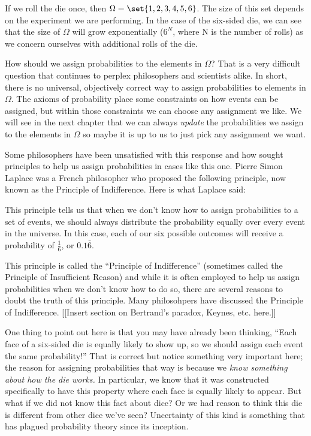 If we roll the die once, then $\Omega=\set{1,2,3,4,5,6}$. The size of this set depends on the experiment we are performing. In the case of the six-sided die, we can see that the size of $\Omega$ will grow exponentially ($6^N$, where N is the number of rolls) as we concern ourselves with additional rolls of the die.

How should we assign probabilities to the elements in $\Omega$? That is a very difficult question that continues to perplex philosophers and scientists alike. In short, there is no universal, objectively correct way to assign probabilities to elements in $\Omega$. The axioms of probability place some constraints on how events can be assigned, but within those constraints we can choose any assignment we like. We will see in the next chapter that we can always \emph{update} the probabilities we assign to the elements in $\Omega$ so maybe it is up to us to just pick any assignment we want.

Some philosophers have been unsatisfied with this response and how sought principles to help us assign probabilities in cases like this one. Pierre Simon Laplace%
was a French philosopher who proposed the following principle, now known as the Principle of Indifference. Here is what Laplace said:
\begin{quote}

\end{quote}
This principle tells us that when we don't know how to assign probabilities to a set of events, we should always distribute the probability equally over every event in the universe. In this case, each of our six possible outcomes will receive a probability of $\frac{1}{6}$, or $0.1\bar{6}$.

This principle is called the ``Principle of Indifference'' (sometimes called the Principle of Insufficient Reason) and while it is often employed to help us assign probabilities when we don't know how to do so, there are several reasons to doubt the truth of this principle. Many philosohpers have discussed the Principle of Indifference. [[Insert section on Bertrand's paradox, Keynes, etc. here.]]

One thing to point out here is that you may have already been thinking, ``Each face of a six-sided die is equally likely to show up, so we should assign each event the same probability!'' That is correct but notice something very important here; the reason for assigning probabilities that way is because we \emph{know something about how the die works.} In particular, we know that it was constructed specifically to have this property where each face is equally likely to appear. But what if we did not know this fact about dice? Or we had reason to think this die is different from other dice we've seen? Uncertainty of this kind is something that has plagued probability theory since its inception.

